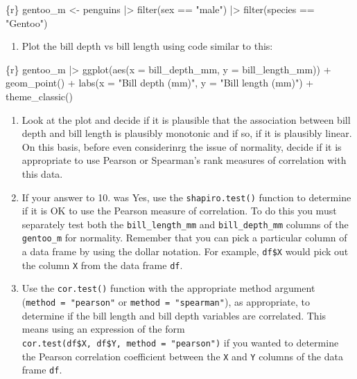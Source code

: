 \documentclass[
  letterpaper,
  DIV=11,
  numbers=noendperiod]{scrreprt}
\newenvironment{Shaded}{\begin{snugshade}}{\end{snugshade}}
\newcommand{\InformationTok}[1]{\textcolor[rgb]{0.37,0.37,0.37}{#1}}
\providecommand{\tightlist}{%
  \setlength{\itemsep}{0pt}\setlength{\parskip}{0pt}}\usepackage{longtable,booktabs,array}
\begin{document}
\begin{Shaded}
\begin{Highlighting}[]
\InformationTok{\textasciigrave{}\textasciigrave{}\textasciigrave{}\{r\}}
\InformationTok{gentoo\_m \textless{}{-} penguins |\textgreater{}}
\InformationTok{filter(sex == "male") |\textgreater{}}
\InformationTok{filter(species == "Gentoo")}
\InformationTok{\textasciigrave{}\textasciigrave{}\textasciigrave{}}
\end{Highlighting}
\end{Shaded}

\begin{enumerate}
\def\labelenumi{\arabic{enumi}.}
\setcounter{enumi}{8}
\tightlist
\item
  Plot the bill depth vs bill length using code similar to this:
\end{enumerate}

\begin{Shaded}
\begin{Highlighting}[]
\InformationTok{\textasciigrave{}\textasciigrave{}\textasciigrave{}\{r\}}
\InformationTok{gentoo\_m |\textgreater{}}
\InformationTok{  ggplot(aes(x = bill\_depth\_mm, y = bill\_length\_mm)) +}
\InformationTok{  geom\_point() +}
\InformationTok{  labs(x = "Bill depth (mm)",}
\InformationTok{       y = "Bill length (mm)") +}
\InformationTok{  theme\_classic()}
\InformationTok{\textasciigrave{}\textasciigrave{}\textasciigrave{}}
\end{Highlighting}
\end{Shaded}

\begin{enumerate}
\def\labelenumi{\arabic{enumi}.}
\setcounter{enumi}{9}
\item
  Look at the plot and decide if it is plausible that the association
  between bill depth and bill length is plausibly monotonic and if so,
  if it is plausibly linear. On this basis, before even considerinrg the
  issue of normality, decide if it is appropriate to use Pearson or
  Spearman's rank measures of correlation with this data.
\item
  If your answer to 10. was Yes, use the \texttt{shapiro.test()}
  function to determine if it is OK to use the Pearson measure of
  correlation. To do this you must separately test both the
  \texttt{bill\_length\_mm} and \texttt{bill\_depth\_mm} columns of the
  \texttt{gentoo\_m} for normality. Remember that you can pick a
  particular column of a data frame by using the dollar notation. For
  example, \texttt{df\$X} would pick out the column \texttt{X} from the
  data frame \texttt{df}.
\item
  Use the \texttt{cor.test()} function with the appropriate method
  argument (\texttt{method\ =\ "pearson"} or
  \texttt{method\ =\ "spearman"}), as appropriate, to determine if the
  bill length and bill depth variables are correlated. This means using
  an expression of the form
  \texttt{cor.test(df\$X,\ df\$Y,\ method\ =\ "pearson")} if you wanted
  to determine the Pearson correlation coefficient between the
  \texttt{X} and \texttt{Y} columns of the data frame \texttt{df}.
\end{enumerate}
\end{document}

